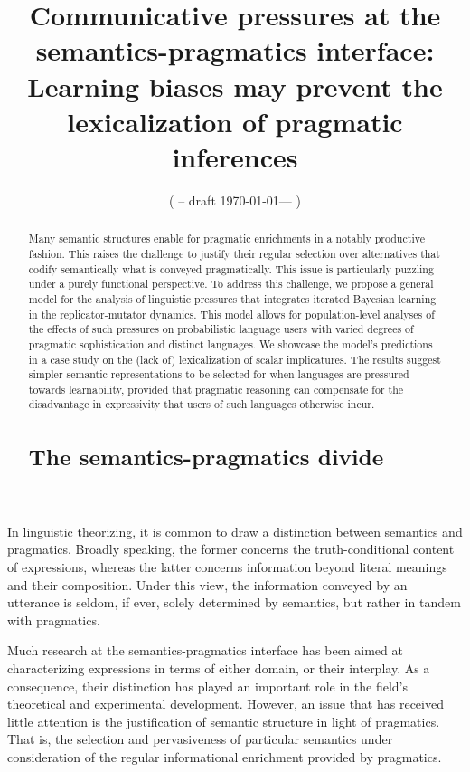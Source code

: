 \documentclass[a4paper]{article}
\title{Communicative pressures at the semantics-pragmatics interface:\\ Learning biases may prevent the lexicalization of pragmatic inferences}
\author{%
    ( -- draft \today --- )
}
\date{}
\begin{document}
\maketitle

\begin{abstract} Many semantic structures enable for pragmatic enrichments in a notably productive fashion. This raises the challenge to justify their regular selection over alternatives that codify semantically what is conveyed pragmatically. This issue is particularly puzzling under a purely functional perspective. To address this challenge, we propose a general model for the analysis of linguistic pressures that integrates iterated Bayesian learning in the replicator-mutator dynamics. This model allows for population-level analyses of the effects of such pressures on probabilistic language users with varied degrees of pragmatic sophistication and distinct languages. We showcase the model's predictions in a case study on the (lack of) lexicalization of scalar implicatures. The results suggest simpler semantic representations to be selected for when languages are pressured towards learnability, provided that pragmatic reasoning can compensate for the disadvantage in expressivity that users of such languages otherwise incur.


\section{The semantics-pragmatics divide}\label{sec:introduction}

\end{abstract}

In linguistic theorizing, it is common to draw a distinction between semantics and pragmatics. Broadly speaking, the former concerns the truth-conditional content of expressions, whereas the latter concerns information beyond literal meanings and their composition. Under this view, the information conveyed by an utterance is seldom, if ever, solely determined by semantics, but rather in tandem with pragmatics. 

Much research at the semantics-pragmatics interface has been aimed at characterizing expressions in terms of either domain, or their interplay. As a consequence, their distinction has played an important role in the field's theoretical and experimental development. However, an issue that has received little attention is the justification of semantic structure in light of pragmatics. That is, the selection and pervasiveness of particular semantics under consideration of the regular informational enrichment provided by pragmatics. 
\end{document}
